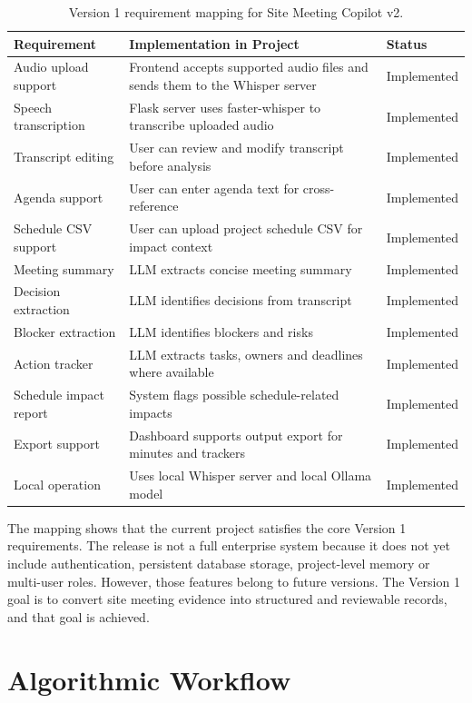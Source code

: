 \documentclass[11pt,a4paper]{article}
\begin{document}
\begin{table}[H]
\centering
\caption{Version 1 requirement mapping for Site Meeting Copilot v2.}
\label{tab:reqmap}
\begin{tabularx}{\textwidth}{p{3.4cm}Y p{2.2cm}}
\toprule
\textbf{Requirement} & \textbf{Implementation in Project} & \textbf{Status} \\
\midrule
Audio upload support & Frontend accepts supported audio files and sends them to the Whisper server & Implemented \\
Speech transcription & Flask server uses faster-whisper to transcribe uploaded audio & Implemented \\
Transcript editing & User can review and modify transcript before analysis & Implemented \\
Agenda support & User can enter agenda text for cross-reference & Implemented \\
Schedule CSV support & User can upload project schedule CSV for impact context & Implemented \\
Meeting summary & LLM extracts concise meeting summary & Implemented \\
Decision extraction & LLM identifies decisions from transcript & Implemented \\
Blocker extraction & LLM identifies blockers and risks & Implemented \\
Action tracker & LLM extracts tasks, owners and deadlines where available & Implemented \\
Schedule impact report & System flags possible schedule-related impacts & Implemented \\
Export support & Dashboard supports output export for minutes and trackers & Implemented \\
Local operation & Uses local Whisper server and local Ollama model & Implemented \\
\bottomrule
\end{tabularx}
\end{table}

The mapping shows that the current project satisfies the core Version 1 requirements. The release is not a full enterprise system because it does not yet include authentication, persistent database storage, project-level memory or multi-user roles. However, those features belong to future versions. The Version 1 goal is to convert site meeting evidence into structured and reviewable records, and that goal is achieved.

\section{Algorithmic Workflow}
\end{document}
